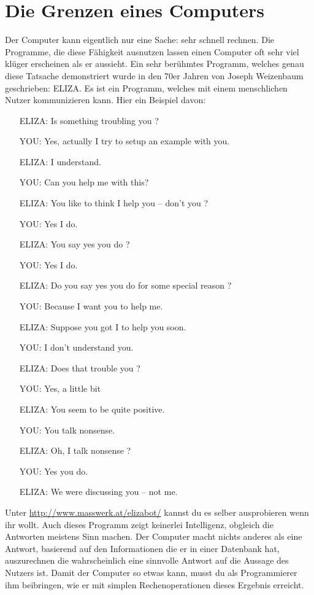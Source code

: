 \chapter{Die Grenzen eines Computers}

Der Computer kann eigentlich nur eine Sache: sehr schnell rechnen. Die Programme, die diese Fähigkeit ausnutzen lassen einen Computer oft sehr viel klüger erscheinen als er aussieht. Ein sehr berühmtes Programm, welches genau diese Tatsache demonstriert wurde in den 70er Jahren von Joseph Weizenbaum geschrieben: ELIZA. Es ist ein Programm, welches mit einem menschlichen Nutzer kommunizieren kann. Hier ein Beispiel davon:

\begin{itemize}
	\item[ELIZA:] Is something troubling you ?
	\item[YOU:] Yes, actually I try to setup an example with you.
	\item[ELIZA:] I understand.
	\item[YOU:] Can you help me with this?
	\item[ELIZA:] You like to think I help you -- don't you ?
	\item[YOU:] Yes I do.
	\item[ELIZA:] You say yes you do ?
	\item[YOU:] Yes I do.
	\item[ELIZA:] Do you say yes you do for some special reason ?
	\item[YOU:] Because I want you to help me.
	\item[ELIZA:] Suppose you got I to help you soon.
	\item[YOU:] I don't understand you.
	\item[ELIZA:] Does that trouble you ?
	\item[YOU:] Yes, a little bit
	\item[ELIZA:] You seem to be quite positive.
	\item[YOU:] You talk nonsense.
	\item[ELIZA:] Oh, I talk nonsense ?
	\item[YOU:] Yes you do.
	\item[ELIZA:] We were discussing you -- not me.
\end{itemize}

Unter \url{http://www.masswerk.at/elizabot/} kannst du es selber ausprobieren wenn ihr wollt. Auch dieses Programm zeigt keinerlei Intelligenz, obgleich die Antworten meistens Sinn machen. Der Computer macht nichts anderes als eine Antwort, basierend auf den Informationen die er in einer Datenbank hat, auszurechnen die wahrscheinlich eine sinnvolle Antwort auf die Aussage des Nutzers ist. Damit der Computer so etwas kann, musst du als Programmierer ihm beibringen, wie er mit simplen Rechenoperationen dieses Ergebnis erreicht.

